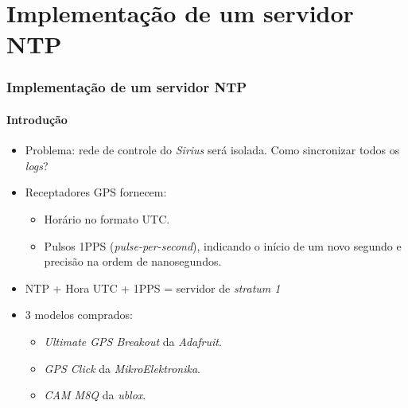 \section {Implementação de um servidor NTP}


\begin{frame}
\frametitle{Implementação de um servidor NTP}
\framesubtitle{Introdução}

\begin{itemize}
  \item Problema: rede de controle do \textit{Sirius} será isolada. Como
  sincronizar todos os \textit{logs}?
  \item Receptadores GPS fornecem:
  \begin{itemize}
    \item Horário no formato UTC.
    \item Pulsos 1PPS (\textit{pulse-per-second}), indicando o início de um novo
    segundo e precisão na ordem de nanosegundos.
  \end{itemize}
  \item NTP + Hora UTC + 1PPS = servidor de \textit{stratum 1}
  
  \item 3 modelos comprados:
  \begin{itemize}
    \item \textit{Ultimate GPS Breakout} da \textit{Adafruit}.
    \item \textit{GPS Click} da \textit{MikroElektronika}. 
    \item \textit{CAM M8Q} da \textit{ublox}.
  \end{itemize} 
\end{itemize}

\end{frame}

